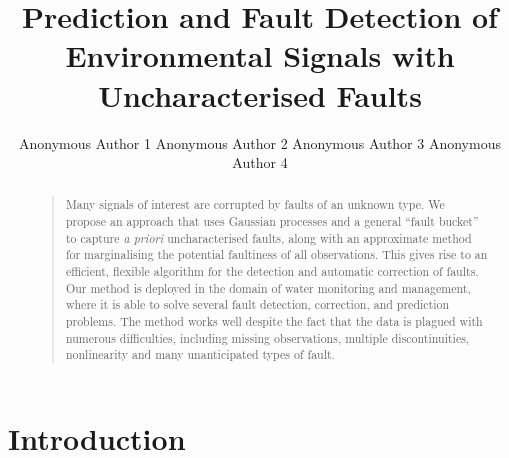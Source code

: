 \documentclass[letterpaper]{article}
\begin{document}
\title{Prediction and Fault Detection of Environmental Signals with Uncharacterised Faults}

\author{ Anonymous Author 1 \And Anonymous Author 2 \And Anonymous Author 3 \And Anonymous Author 4}

% 

\maketitle

\begin{abstract}
\begin{quote}
 Many signals of interest are corrupted by faults of an unknown
type. We propose an approach that uses Gaussian processes and a
general ``fault bucket'' to capture \textit{a priori} uncharacterised
faults, along with an approximate method for marginalising the
potential faultiness of all observations. This gives rise to an
efficient, flexible algorithm for the detection and automatic
correction of faults. Our method is deployed in the domain of water
monitoring and management, where it is able to solve several fault
detection, correction, and prediction problems. The method works well
despite the fact that the data is plagued with numerous difficulties,
including missing observations, multiple discontinuities, nonlinearity and many unanticipated types of fault.
\end{quote}
\end{abstract}

\section{Introduction}
\end{document}
